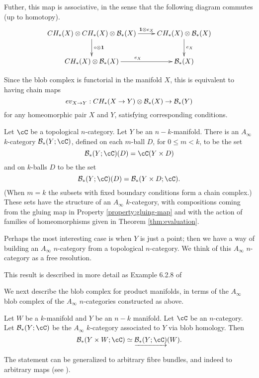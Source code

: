 \documentclass{pnastwo}
\begin{document}
\begin{article}
\begin{thm}
Futher, this map is associative, in the sense that the following diagram commutes (up to homotopy).
\begin{equation*}
\xymatrix{
\CH{X} \tensor \CH{X} \tensor \bc_*(X) \ar[r]^<<<<<{\id \tensor e_X} \ar[d]^{\compose \tensor \id} & \CH{X} \tensor \bc_*(X) \ar[d]^{e_X} \\
\CH{X} \tensor \bc_*(X) \ar[r]^{e_X} & \bc_*(X)
}
\end{equation*}
\end{thm}

Since the blob complex is functorial in the manifold $X$, this is equivalent to having chain maps
$$ev_{X \to Y} : CH_*(X \to Y) \otimes {\mathcal B}_*(X) \to {\mathcal B}_*(Y)$$
for any homeomorphic pair $X$ and $Y$, 
satisfying corresponding conditions.

\begin{thm}
\label{thm:blobs-ainfty}
Let $\cC$ be  a topological $n$-category.
Let $Y$ be an $n{-}k$-manifold. 
There is an $A_\infty$ $k$-category $\bc_*(Y;\cC)$, defined on each $m$-ball $D$, for $0 \leq m < k$, 
to be the set $$\bc_*(Y;\cC)(D) = \cC(Y \times D)$$ and on $k$-balls $D$ to be the set 
$$\bc_*(Y;\cC)(D) = \bc_*(Y \times D; \cC).$$ 
(When $m=k$ the subsets with fixed boundary conditions form a chain complex.) 
These sets have the structure of an $A_\infty$ $k$-category, with compositions coming from the gluing map in 
Property \ref{property:gluing-map} and with the action of families of homeomorphisms given in Theorem \ref{thm:evaluation}.
\end{thm}
\begin{rem}
Perhaps the most interesting case is when $Y$ is just a point; then we have a way of building an $A_\infty$ $n$-category from a topological $n$-category.
We think of this $A_\infty$ $n$-category as a free resolution.
\end{rem}
This result is described in more detail as Example 6.2.8 of \cite{1009.5025}

We next describe the blob complex for product manifolds, in terms of the $A_\infty$ blob complex of the $A_\infty$ $n$-categories constructed as above.

\begin{thm}
\label{thm:product}
Let $W$ be a $k$-manifold and $Y$ be an $n-k$ manifold.
Let $\cC$ be an $n$-category.
Let $\bc_*(Y;\cC)$ be the $A_\infty$ $k$-category associated to $Y$ via blob homology.
Then
\[
	\bc_*(Y\times W; \cC) \simeq \cl{\bc_*(Y;\cC)}(W).
\]
\end{thm}
The statement can be generalized to arbitrary fibre bundles, and indeed to arbitrary maps
(see \cite[\S7.1]{1009.5025}).


\end{article}
\end{document}
